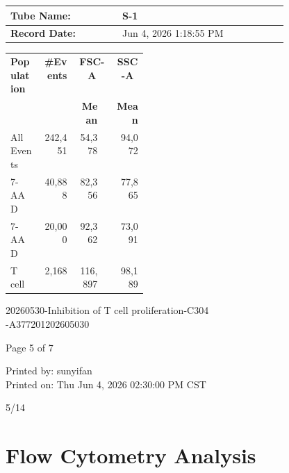 \documentclass[UTF8,10pt,a4paper,fontset=fandol]{ctexart}
\newcommand{\handwritten}[1]{#1}
\begin{document}
\begin{center}
\begin{tabular}{|p{0.27\linewidth}|p{0.40\linewidth}|}
\hline
\textbf{Tube Name:} & S-1\\
\hline
\textbf{Record Date:} & Jun 4, 2026 1:18:55 PM\\
\hline
\end{tabular}

\vspace{0.2em}

\begin{tabular}{|p{0.23\linewidth}|r|r|r|r|}
\hline
\textbf{Population} & \textbf{\#Events} & \multicolumn{2}{c|}{\textbf{FSC-A}} & \multicolumn{1}{c|}{\textbf{SSC-A}}\\
\cline{3-5}
& & \textbf{Mean} & & \textbf{Mean}\\
\hline
All Events & 242,451 & 54,378 & & 94,072\\
7-AAD & 40,888 & 82,356 & & 77,865\\
7-AAD & 20,000 & 92,362 & & 73,091\\
T cell & 2,168 & 116,897 & & 98,189\\
\hline
\end{tabular}
\end{center}

\vfill

\noindent
\begin{minipage}[t]{0.35\linewidth}
\footnotesize
20260530-Inhibition of T cell proliferation-C304\\
-A377201202605030
\end{minipage}
\hfill
\begin{minipage}[t]{0.18\linewidth}
\centering
\footnotesize
Page 5 of 7
\end{minipage}
\hfill
\begin{minipage}[t]{0.35\linewidth}
\raggedleft
\footnotesize
Printed by: sunyifan\\
Printed on: Thu Jun 4, 2026 02:30:00 PM CST
\end{minipage}

\vspace{0.5em}

\begin{flushright}
\handwritten{5/14}
\end{flushright}

\newpage

\section*{Flow Cytometry Analysis}
\end{document}
